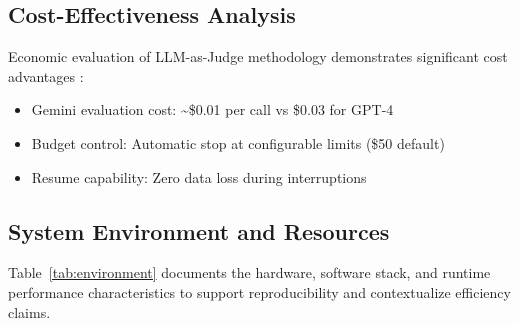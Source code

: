 \documentclass[conference]{IEEEtran}
\begin{document}
\subsection{Cost-Effectiveness Analysis}

Economic evaluation of LLM-as-Judge methodology demonstrates significant cost advantages \cite{llm_judge}:

\begin{itemize}
\item Gemini evaluation cost: \textasciitilde\$0.01 per call vs \$0.03 for GPT-4
\item Budget control: Automatic stop at configurable limits (\$50 default)
\item Resume capability: Zero data loss during interruptions
\end{itemize}

\subsection{System Environment and Resources}
Table~\ref{tab:environment} documents the hardware, software stack, and runtime performance characteristics to support reproducibility and contextualize efficiency claims.
\end{document}
